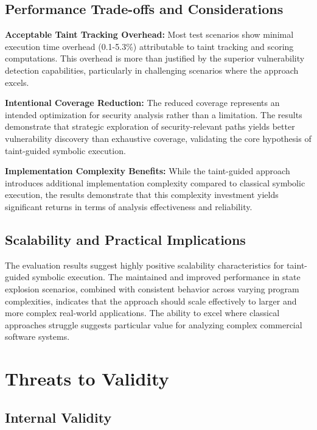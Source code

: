 \subsection{Performance Trade-offs and Considerations}

\textbf{Acceptable Taint Tracking Overhead:} Most test scenarios show minimal execution time overhead (0.1-5.3\%) attributable to taint tracking and scoring computations. This overhead is more than justified by the superior vulnerability detection capabilities, particularly in challenging scenarios where the approach excels.

\textbf{Intentional Coverage Reduction:} The reduced coverage represents an intended optimization for security analysis rather than a limitation. The results demonstrate that strategic exploration of security-relevant paths yields better vulnerability discovery than exhaustive coverage, validating the core hypothesis of taint-guided symbolic execution.

\textbf{Implementation Complexity Benefits:} While the taint-guided approach introduces additional implementation complexity compared to classical symbolic execution, the results demonstrate that this complexity investment yields significant returns in terms of analysis effectiveness and reliability.

\subsection{Scalability and Practical Implications}

The evaluation results suggest highly positive scalability characteristics for taint-guided symbolic execution. The maintained and improved performance in state explosion scenarios, combined with consistent behavior across varying program complexities, indicates that the approach should scale effectively to larger and more complex real-world applications. The ability to excel where classical approaches struggle suggests particular value for analyzing complex commercial software systems.

\section{Threats to Validity}

\subsection{Internal Validity}

